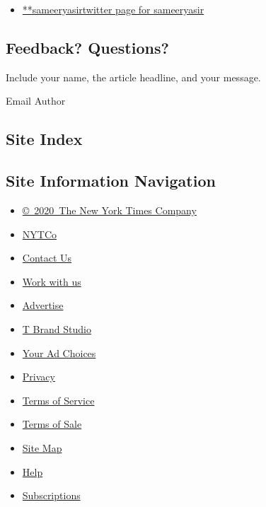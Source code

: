 \begin{itemize}
\tightlist
\item
  \href{https://twitter.com/sameeryasir}{**sameeryasirtwitter page for
  sameeryasir}
\end{itemize}

\hypertarget{feedback-questions}{%
\subsection{Feedback? Questions?}\label{feedback-questions}}

Include your name, the article headline, and your message.

Email Author

\hypertarget{site-index}{%
\subsection{Site Index}\label{site-index}}

\hypertarget{site-information-navigation}{%
\subsection{Site Information
Navigation}\label{site-information-navigation}}

\begin{itemize}
\tightlist
\item
  \href{https://help.nytimes.com/hc/en-us/articles/115014792127-Copyright-notice}{©~2020~The
  New York Times Company}
\end{itemize}

\begin{itemize}
\tightlist
\item
  \href{https://www.nytco.com/}{NYTCo}
\item
  \href{https://help.nytimes.com/hc/en-us/articles/115015385887-Contact-Us}{Contact
  Us}
\item
  \href{https://www.nytco.com/careers/}{Work with us}
\item
  \href{https://nytmediakit.com/}{Advertise}
\item
  \href{http://www.tbrandstudio.com/}{T Brand Studio}
\item
  \href{https://www.nytimes.com/privacy/cookie-policy\#how-do-i-manage-trackers}{Your
  Ad Choices}
\item
  \href{https://www.nytimes.com/privacy}{Privacy}
\item
  \href{https://help.nytimes.com/hc/en-us/articles/115014893428-Terms-of-service}{Terms
  of Service}
\item
  \href{https://help.nytimes.com/hc/en-us/articles/115014893968-Terms-of-sale}{Terms
  of Sale}
\item
  \href{https://spiderbites.nytimes.com}{Site Map}
\item
  \href{https://help.nytimes.com/hc/en-us}{Help}
\item
  \href{https://www.nytimes.com/subscription?campaignId=37WXW}{Subscriptions}
\end{itemize}

